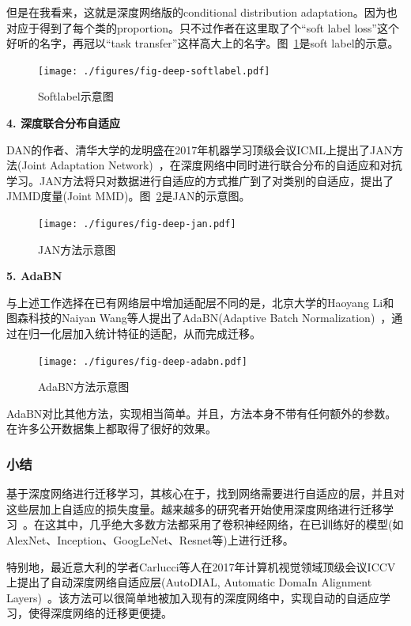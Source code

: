 但是在我看来，这就是深度网络版的conditional distribution adaptation。因为也对应于得到了每个类的proportion。只不过作者在这里取了个“soft label loss”这个好听的名字，再冠以“task transfer”这样高大上的名字。图~\ref{fig-deep-softlabel}是soft label的示意。

\begin{figure}[htbp]
	\centering
	\texttt{[image: ./figures/fig-deep-softlabel.pdf]}
	\caption{Softlabel示意图}
	\label{fig-deep-softlabel}
\end{figure}

\textbf{4. 深度联合分布自适应}

DAN的作者、清华大学的龙明盛在2017年机器学习顶级会议ICML上提出了JAN方法(Joint Adaptation Network)~\cite{long2017deep}，在深度网络中同时进行联合分布的自适应和对抗学习。JAN方法将只对数据进行自适应的方式推广到了对类别的自适应，提出了JMMD度量(Joint MMD)。图~\ref{fig-deep-jan}是JAN的示意图。

\begin{figure}[htbp]
	\centering
	\texttt{[image: ./figures/fig-deep-jan.pdf]}
	\caption{JAN方法示意图}
	\label{fig-deep-jan}
\end{figure}

\textbf{5. AdaBN}

与上述工作选择在已有网络层中增加适配层不同的是，北京大学的Haoyang Li和图森科技的Naiyan Wang等人提出了AdaBN(Adaptive Batch Normalization)~\cite{li2018adaptive}，通过在归一化层加入统计特征的适配，从而完成迁移。

\begin{figure}[htbp]
	\centering
	\texttt{[image: ./figures/fig-deep-adabn.pdf]}
	\caption{AdaBN方法示意图}
	\label{fig-deep-adabn}
\end{figure}

AdaBN对比其他方法，实现相当简单。并且，方法本身不带有任何额外的参数。在许多公开数据集上都取得了很好的效果。

\subsubsection{小结}

基于深度网络进行迁移学习，其核心在于，找到网络需要进行自适应的层，并且对这些层加上自适应的损失度量。越来越多的研究者开始使用深度网络进行迁移学习~\cite{long2016deep,zhuo2017deep,zhuang2015supervised,sun2016deep,wei2016deep,luo2017label}。在这其中，几乎绝大多数方法都采用了卷积神经网络，在已训练好的模型(如AlexNet、Inception、GoogLeNet、Resnet等)上进行迁移。

特别地，最近意大利的学者Carlucci等人在2017年计算机视觉领域顶级会议ICCV上提出了自动深度网络自适应层(AutoDIAL, Automatic DomaIn Alignment Layers)~\cite{carlucci2017autodial}。该方法可以很简单地被加入现有的深度网络中，实现自动的自适应学习，使得深度网络的迁移更便捷。

